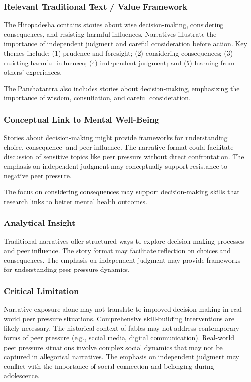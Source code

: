 \documentclass[12pt,a4paper,twocolumn]{article}
\begin{document}
\subsubsection{Relevant Traditional Text / Value Framework}

The Hitopadesha contains stories about wise decision-making, considering consequences, and resisting harmful influences. Narratives illustrate the importance of independent judgment and careful consideration before action. Key themes include: (1) prudence and foresight; (2) considering consequences; (3) resisting harmful influences; (4) independent judgment; and (5) learning from others' experiences.

The Panchatantra also includes stories about decision-making, emphasizing the importance of wisdom, consultation, and careful consideration.

\subsubsection{Conceptual Link to Mental Well-Being}

Stories about decision-making might provide frameworks for understanding choice, consequence, and peer influence. The narrative format could facilitate discussion of sensitive topics like peer pressure without direct confrontation. The emphasis on independent judgment may conceptually support resistance to negative peer pressure.

The focus on considering consequences may support decision-making skills that research links to better mental health outcomes.

\subsubsection{Analytical Insight}

Traditional narratives offer structured ways to explore decision-making processes and peer influence. The story format may facilitate reflection on choices and consequences. The emphasis on independent judgment may provide frameworks for understanding peer pressure dynamics.

\subsubsection{Critical Limitation}

Narrative exposure alone may not translate to improved decision-making in real-world peer pressure situations. Comprehensive skill-building interventions are likely necessary. The historical context of fables may not address contemporary forms of peer pressure (e.g., social media, digital communication). Real-world peer pressure situations involve complex social dynamics that may not be captured in allegorical narratives. The emphasis on independent judgment may conflict with the importance of social connection and belonging during adolescence.
\end{document}
